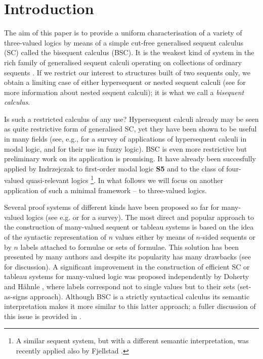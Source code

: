 \documentclass[10pt,a4paper]{article}
\theoremstyle{definition}
\newcommand{\3}{\vspace{.3in}}
\newcommand{\2}{\vspace{.2in}}
\newcommand{\1}{\vspace{.1in}}
\newcommand{\5}{\vspace{.05in}}
\begin{document}
\section{Introduction}\label{Intro}
The aim of this paper is to provide a uniform characterisation of a variety of three-valued logics by means of a  simple cut-free generalised sequent calculus (SC) called the bisequent calculus (BSC).  It is the weakest kind of system in the rich family of generalised sequent calculi operating
on collections of ordinary sequents \cite{Indrzejczak1}. If we restrict our interest to structures built of two sequents only, we obtain a limiting case of either hypersequent or nested sequent calculi (see \cite{LellmannPoggiolesi,Poggiolesi} for more information about nested sequent calculi); it is what we call a \textit{bisequent calculus}. 

 Is such a restricted calculus of any use? Hypersequent calculi already may be seen as quite restrictive form of generalised SC, yet they have been shown to be useful in many fields (see, e.g., \cite{Indrzejczak2} for a survey of applications of hypersequent calculi in modal logic, and \cite{MetcalfeOlivettiGabbay} for their use in fuzzy logic). BSC is even more restrictive but preliminary work on its application is promising.
It have already been succesfully applied by Indrzejczak to first-order modal logic {\bf S5} \cite{Indrzejczak1} and to the class of four-valued quasi-relevant logics \cite{Indrzejczak3}\footnote{A similar sequent system, but with a different semantic interpretation, was recently applied also by Fjellstad \cite{Fjellstad1,Fjellstad2}.}. In what follows we will focus on another application of such a minimal framework -- to three-valued logics.

Several proof systems of different kinds have been proposed so far for many-valued logics (see e.g. \cite{hah:tab01} or \cite{baaz01} for a survey).
The most direct and popular approach to the construction of many-valued sequent or tableau systems is based on the idea of the syntactic
representation of $n$ values either by means of $n$-sided sequents or by $n$ labels attached to formulae or sets of formulae. This solution has been
presented by many authors and despite its popularity has many drawbacks (see \cite{Indrzejczak2}  for discussion). A significant improvement in the construction of efficient SC or tableau systems for many-valued logic was proposed independently by Doherty \cite{doh:con91} and H\"ahnle \cite{hah:aut94}, where labels
correspond not to single values but to their sets (set-as-signs approach). Although BSC is a strictly syntactical calculus its semantic interpretation makes it more similar to this latter approach; a fuller discussion of this issue is provided in \cite{Indrzejczak3}. 
\end{document}
